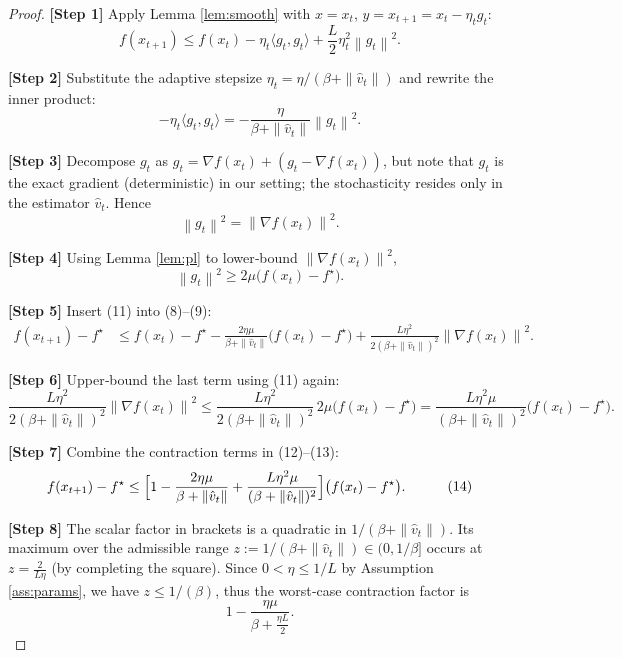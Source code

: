 \documentclass{article}
\newcommand{\norm}[1]{\left\|#1\right\|}
\newcommand{\ip}[2]{\langle #1,#2\rangle}
\begin{document}
\begin{proof}
\textbf{[Step 1]} Apply Lemma \ref{lem:smooth} with $x=x_t$, $y=x_{t+1}=x_t-\eta_t g_t$:
\[
    f(x_{t+1}) \le f(x_t) - \eta_t\ip{g_t}{g_t}
                + \frac{L}{2}\eta_t^2\norm{g_t}^2 .
\tag{8}
\]

\textbf{[Step 2]} Substitute the adaptive stepsize $\eta_t=\eta/(\beta+\|\hat v_t\|)$ and rewrite the inner product:
\[
    -\eta_t\ip{g_t}{g_t}= -\frac{\eta}{\beta+\|\hat v_t\|}\norm{g_t}^2 .
\tag{9}
\]

\textbf{[Step 3]} Decompose $g_t$ as $g_t = \nabla f(x_t) + (g_t-\nabla f(x_t))$, but note that $g_t$ is the exact gradient (deterministic) in our setting; the stochasticity resides only in the estimator $\hat v_t$. Hence
\[
    \norm{g_t}^2 = \norm{\nabla f(x_t)}^2 .
\tag{10}
\]

\textbf{[Step 4]} Using Lemma \ref{lem:pl} to lower‑bound $\norm{\nabla f(x_t)}^2$,
\[
    \norm{g_t}^2 \ge 2\mu\bigl(f(x_t)-f^\star\bigr) .
\tag{11}
\]

\textbf{[Step 5]} Insert (11) into (8)–(9):
\[
\begin{aligned}
    f(x_{t+1}) - f^\star
    &\le f(x_t)-f^\star
       -\frac{2\eta\mu}{\beta+\|\hat v_t\|}\bigl(f(x_t)-f^\star\bigr)
       +\frac{L\eta^2}{2(\beta+\|\hat v_t\|)^2}\norm{\nabla f(x_t)}^2 .
\end{aligned}
\tag{12}
\]

\textbf{[Step 6]} Upper‑bound the last term using (11) again:
\[
    \frac{L\eta^2}{2(\beta+\|\hat v_t\|)^2}\norm{\nabla f(x_t)}^2
    \le \frac{L\eta^2}{2(\beta+\|\hat v_t\|)^2}\,2\mu\bigl(f(x_t)-f^\star\bigr)
    = \frac{L\eta^2\mu}{(\beta+\|\hat v_t\|)^2}\bigl(f(x_t)-f^\star\bigr).
\tag{13}
\]

\textbf{[Step 7]} Combine the contraction terms in (12)–(13):
\[
\begin{aligned}
    f(x_{t+1})-f^\star
    &\le \Bigl[1-\frac{2\eta\mu}{\beta+\|\hat v_t\|}
               +\frac{L\eta^2\mu}{(\beta+\|\hat v_t\|)^2}\Bigr]
               \bigl(f(x_t)-f^\star\bigr) .
\end{aligned}
\tag{14}
\]

\textbf{[Step 8]} The scalar factor in brackets is a quadratic in $1/(\beta+\|\hat v_t\|)$. Its maximum over the admissible range $z:=1/(\beta+\|\hat v_t\|)\in (0,1/\beta]$ occurs at $z=\frac{2}{L\eta}$ (by completing the square). Since $0<\eta\le 1/L$ by Assumption \ref{ass:params}, we have $z\le 1/(\beta)$, thus the worst‑case contraction factor is
\[
    1-\frac{\eta\mu}{\beta+\frac{\eta L}{2}} .
\tag{15}
\]


\end{proof}
\end{document}
